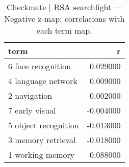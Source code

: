 \begin{table}
\caption{Checkmate | RSA searchlight — Negative z-map: correlations with each term map.}
\label{tab:Checkmate | RSA searchlight_neg}
\begin{tabular}{lr}
\toprule
term & r \\
\midrule
6 face recognition & 0.029000 \\
4 language network & 0.009000 \\
2 navigation & -0.002000 \\
7 early visual & -0.004000 \\
5 object recognition & -0.013000 \\
3 memory retrieval & -0.018000 \\
1 working memory & -0.088000 \\
\bottomrule
\end{tabular}
\end{table}
